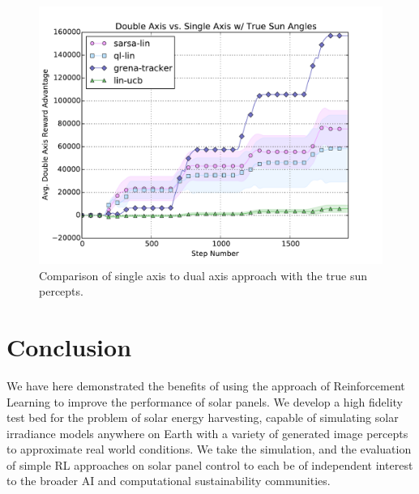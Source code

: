 \documentclass{article}
\begin{document}
{%
\begin{figure}
\begin{center}
\includegraphics[scale=0.26]{figures/saxis_vs_daxis_true}
\caption{Comparison of single axis to dual axis approach with the true sun percepts.}
\label{fig:results_axis}
\end{center}
\end{figure}








\section{Conclusion}

We have here demonstrated the benefits of using the approach of Reinforcement Learning to improve the performance of solar panels. We develop a high fidelity test bed for the problem of solar energy harvesting, capable of simulating solar irradiance models anywhere on Earth with a variety of generated image percepts to approximate real world conditions. We take the simulation, and the evaluation of simple RL approaches on solar panel control to each be of independent interest to the broader AI and computational sustainability communities.

}
\end{document}
